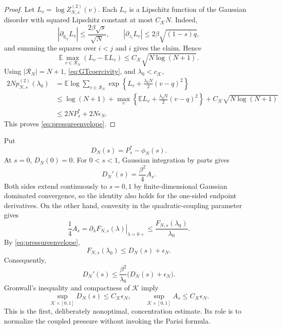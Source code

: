 \documentclass[11pt]{article}
\numberwithin{equation}{section}
\theoremstyle{plain}
\theoremstyle{definition}
\newcommand{\E}{\mathbb E}
\newcommand{\1}{\mathbf 1}
\newcommand{\cK}{\mathcal K}
\begin{document}
\begin{proof}
Let $L_v=\log Z^{(2)}_{N,s}(v)$.  Each $L_v$ is a Lipschitz function
of the Gaussian disorder with squared Lipschitz constant at most
$C_{\cK}N$.  Indeed,
\[
 \left|\partial_{g_{ij}}L_v\right|
 \le\frac{2\beta\sqrt s}{\sqrt N},\qquad
 \left|\partial_{z_i}L_v\right|
 \le2\beta\sqrt{(1-s)q},
\]
and summing the squares over $i<j$ and $i$ gives the claim.  Hence
\begin{equation}
 \E\max_{v\in\mathcal R_N}(L_v-\E L_v)
 \le C_{\cK}\sqrt{N\log(N+1)}.
 \label{eq:gaussianmax}
\end{equation}
Using $|\mathcal R_N|=N+1$, \eqref{eq:GTcoercivity}, and
$\lambda_0<c_{\cK}$,
\begin{align*}
 2Np^{(2)}_{N,s}(\lambda_0)
 &=
 \E\log\sum_{v\in\mathcal R_N}
 \exp\left\{L_v+\frac{\lambda_0N}{2}(v-q)^2\right\}\\
 &\le
 \log(N+1)+
 \max_v\left\{\E L_v+\frac{\lambda_0N}{2}(v-q)^2\right\}
 +C_{\cK}\sqrt{N\log(N+1)}\\
 &\le2NP_s^*+2N\epsilon_N.
\end{align*}
This proves \eqref{eq:pressureenvelope}.
\end{proof}

Put
\begin{equation}
 D_N(s)=P_s^*-\phi_N(s).
 \label{eq:DN}
\end{equation}
At $s=0$, $D_N(0)=0$.  For $0<s<1$, Gaussian integration by parts
gives
\begin{equation}
 D_N'(s)=\frac{\beta^2}{4}A_s.
 \label{eq:DNprime}
\end{equation}
Both sides extend continuously to $s=0,1$ by finite-dimensional
Gaussian dominated convergence, so the identity also holds for the
one-sided endpoint derivatives.
On the other hand, convexity in the quadratic-coupling parameter gives
\[
 \frac14A_s
 =\left.\partial_\lambda F_{N,s}(\lambda)\right|_{\lambda=0+}
 \le\frac{F_{N,s}(\lambda_0)}{\lambda_0}.
\]
By \eqref{eq:pressureenvelope},
\[
 F_{N,s}(\lambda_0)
 \le D_N(s)+\epsilon_N.
\]
Consequently,
\begin{equation}
 D_N'(s)
 \le\frac{\beta^2}{\lambda_0}
 \bigl(D_N(s)+\epsilon_N\bigr).
 \label{eq:gronwallDN}
\end{equation}
Gronwall's inequality and compactness of $\cK$ imply
\begin{equation}
 \sup_{\cK\times[0,1]}D_N(s)\le C_{\cK}\epsilon_N,
 \qquad
 \sup_{\cK\times[0,1]}A_s\le C_{\cK}\epsilon_N.
 \label{eq:preconcentration}
\end{equation}
This is the first, deliberately nonoptimal, concentration estimate.
Its role is to normalize the coupled pressure without invoking the
Parisi formula.
\end{document}
